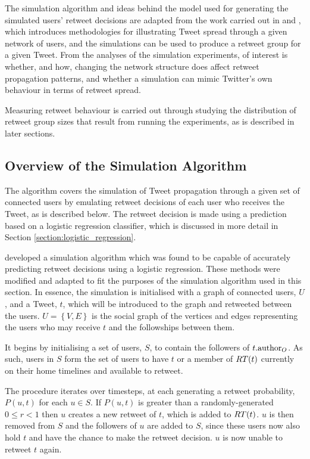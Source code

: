 The simulation algorithm and ideas behind the model used for generating the simulated users' retweet decisions are adapted from the work carried out in \cite{zhu11} and \cite{peng11}, which introduces methodologies for illustrating Tweet spread through a given network of users, and the simulations can be used to produce a retweet group for a given Tweet. From the analyses of the simulation experiments, of interest is whether, and how, changing the network structure does affect retweet propagation patterns, and whether a simulation can mimic Twitter's own behaviour in terms of retweet spread.

Measuring retweet behaviour is carried out through studying the distribution of retweet group sizes that result from running the experiments, as is described in later sections.

\subsection{Overview of the Simulation Algorithm}
The algorithm covers the simulation of Tweet propagation through a given set of connected users by emulating retweet decisions of each user who receives the Tweet, as is described below. The retweet decision is made using a prediction based on a logistic regression classifier, which is discussed in more detail in Section \ref{section:logistic_regression}.

\cite{zhu11} developed a simulation algorithm which was found to be capable of accurately predicting retweet decisions using a logistic regression. These methods were modified and adapted to fit the purposes of the simulation algorithm used in this section. In essence, the simulation is initialised with a graph of connected users, $U$, and a Tweet, $t$, which will be introduced to the graph and retweeted between the users. $U = \left\{V,E\right\}$ is the social graph of the vertices and edges representing the users who may receive $t$ and the followships between them.

It begins by initialising a set of users, $S$, to contain the followers of $t.\textrm{author}_O$. As such, users in $S$ form the set of users to have $t$ or a member of $RT(t)$ currently on their home timelines and available to retweet. 

The procedure iterates over timesteps, at each generating a retweet probability, $P(u,t)$ for each $u \in S$. If $P(u,t)$ is greater than a randomly-generated $0 \leq r < 1$ then $u$ creates a new retweet of $t$, which is added to $RT(t)$. $u$ is then removed from $S$ and the followers of $u$ are added to $S$, since these users now also hold $t$ and have the chance to make the retweet decision. $u$ is now unable to retweet $t$ again.

